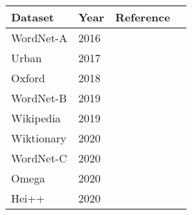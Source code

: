 \small
\begin{tabular}{|l|l|l|l|}
    \hline
    Dataset    & Year & Reference                            \\
    \hline
    WordNet-A  & 2016 & \cite{noraset_definition_2016}       \\
    Urban      & 2017 & \cite{ni_learning_2017}              \\
    Oxford     & 2018 & \cite{gadetsky_conditional_2018}     \\
    WordNet-B  & 2019 & \cite{ishiwatari_learning_2019}      \\
    Wikipedia  & 2019 & \cite{ishiwatari_learning_2019}      \\
    Wiktionary & 2020 & \cite{kabiri_evaluating_2020}        \\
    WordNet-C  & 2020 & \cite{kabiri_evaluating_2020}        \\
    Omega      & 2020 & \cite{kabiri_evaluating_2020}        \\
    Hei++      & 2020 & \cite{bevilacqua_generationary_2020} \\
    \hline
\end{tabular}
